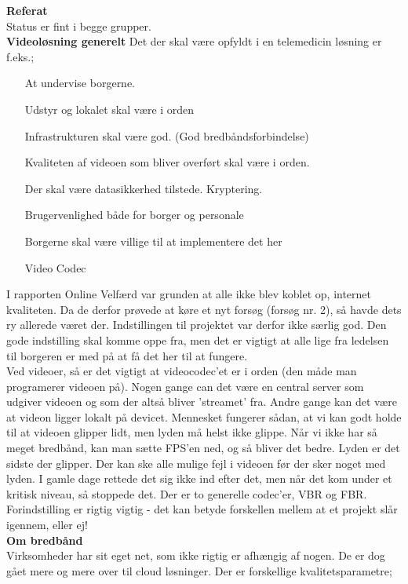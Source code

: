 \textbf{Referat} 
\\
Status er fint i begge grupper.\\
\textbf{Videoløsning generelt}
Det der skal være opfyldt i en telemedicin løsning er f.eks.; 
\begin{itemize}
\item[At undervise borgerne.]
\item[Udstyr og lokalet skal være i orden]
\item[Infrastrukturen skal være god. (God bredbåndsforbindelse)]
\item[Kvaliteten af videoen som bliver overført skal være i orden.]
\item[Der skal være datasikkerhed tilstede. Kryptering.]
\item[Brugervenlighed både for borger og personale]
\item[Borgerne skal være villige til at implementere det her]
\item[Video Codec]
\end{itemize}
I rapporten Online Velfærd var grunden at alle ikke blev koblet op, internet kvaliteten. Da de derfor prøvede at køre et nyt forsøg (forsøg nr. 2), så havde dets ry allerede været der. Indstillingen til projektet var derfor ikke særlig god. Den gode indstilling skal komme oppe fra, men det er vigtigt at alle lige fra ledelsen til borgeren er med på at få det her til at fungere.\\
Ved videoer, så er det vigtigt at videocodec'et er i orden (den måde man programerer videoen på). Nogen gange can det være en central server som udgiver videoen og som der altså bliver 'streamet' fra. Andre gange kan det være at videon ligger lokalt på devicet. Mennesket fungerer sådan, at vi kan godt holde til at videoen glipper lidt, men lyden må helst ikke glippe. Når vi ikke har så meget bredbånd, kan man sætte FPS'en ned, og så bliver det bedre. Lyden er det sidste der glipper. Der kan ske alle mulige fejl i videoen før der sker noget med lyden. I gamle dage rettede det sig ikke ind efter det, men når det kom under et kritisk niveau, så stoppede det. Der er to generelle codec'er, VBR og FBR. \\
Forindstilling er rigtig vigtig - det kan betyde forskellen mellem at et projekt slår igennem, eller ej! \\
\textbf{Om bredbånd}\\
Virksomheder har sit eget net, som ikke rigtig er afhængig af nogen. De er dog gået mere og mere over til cloud løsninger. 
Der er forskellige kvalitetsparametre; 
